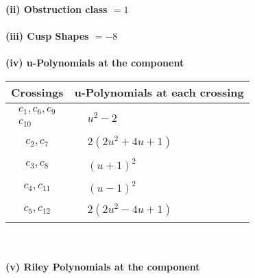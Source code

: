 \documentclass[1p]{elsarticle_modified}
\theoremstyle{definition}
\begin{document}
\flushleft \textbf{(ii) Obstruction class $= 1$}\\~\\
\flushleft \textbf{(iii) Cusp Shapes $= -8$}\\~\\
\newpage\renewcommand{\arraystretch}{1}
\flushleft \textbf{(iv) u-Polynomials at the component}\newline \\
\begin{tabular}{m{50pt}|m{274pt}}
Crossings & \hspace{64pt}u-Polynomials at each crossing \\
\hline $$\begin{aligned}c_{1},c_{6},c_{9}\\c_{10}\end{aligned}$$&$\begin{aligned}
&u^2-2
\end{aligned}$\\
\hline $$\begin{aligned}c_{2},c_{7}\end{aligned}$$&$\begin{aligned}
&2(2 u^2+4 u+1)
\end{aligned}$\\
\hline $$\begin{aligned}c_{3},c_{8}\end{aligned}$$&$\begin{aligned}
&(u+1)^2
\end{aligned}$\\
\hline $$\begin{aligned}c_{4},c_{11}\end{aligned}$$&$\begin{aligned}
&(u-1)^2
\end{aligned}$\\
\hline $$\begin{aligned}c_{5},c_{12}\end{aligned}$$&$\begin{aligned}
&2(2 u^2-4 u+1)
\end{aligned}$\\
\hline
\end{tabular}\\~\\
\newpage\renewcommand{\arraystretch}{1}
\flushleft \textbf{(v) Riley Polynomials at the component}\newline \\
\end{document}
